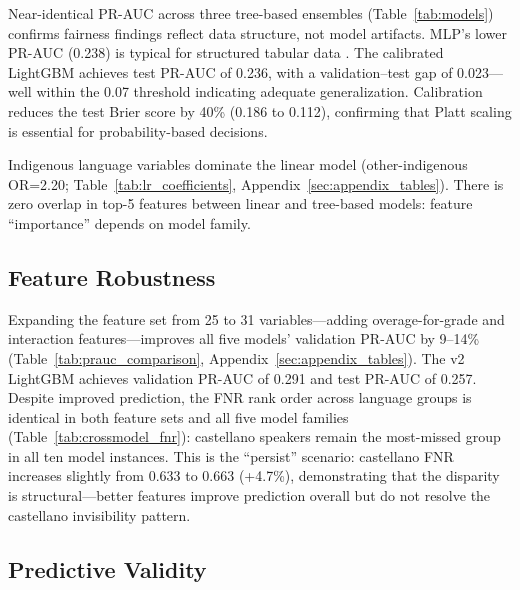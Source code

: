\documentclass[notitlepage,12pt]{jedm}
\begin{document}
\begin{table}[htbp]
  \caption{Model Performance Comparison Across Five Families (Survey-Weighted Metrics). The 31f column shows validation PR-AUC after adding 6 overage and interaction features.}\vspace*{1ex}
  \label{tab:models}
  
\end{table}

Near-identical PR-AUC across three tree-based ensembles (Table~\ref{tab:models}) confirms fairness findings reflect data structure, not model artifacts. MLP's lower PR-AUC (0.238) is typical for structured tabular data \cite{ke2017lightgbm}. The calibrated LightGBM achieves test PR-AUC of 0.236, with a validation--test gap of 0.023---well within the 0.07 threshold indicating adequate generalization. Calibration reduces the test Brier score by 40\% (0.186 to 0.112), confirming that Platt scaling is essential for probability-based decisions.

Indigenous language variables dominate the linear model (other-indigenous OR=2.20; Table~\ref{tab:lr_coefficients}, Appendix~\ref{sec:appendix_tables}). There is zero overlap in top-5 features between linear and tree-based models: feature ``importance'' depends on model family.

\subsection{Feature Robustness}

Expanding the feature set from 25 to 31 variables---adding overage-for-grade and interaction features---improves all five models' validation PR-AUC by 9--14\% (Table~\ref{tab:prauc_comparison}, Appendix~\ref{sec:appendix_tables}). The v2 LightGBM achieves validation PR-AUC of 0.291 and test PR-AUC of 0.257. Despite improved prediction, the FNR rank order across language groups is identical in both feature sets and all five model families (Table~\ref{tab:crossmodel_fnr}): castellano speakers remain the most-missed group in all ten model instances. This is the ``persist'' scenario: castellano FNR increases slightly from 0.633 to 0.663 (+4.7\%), demonstrating that the disparity is structural---better features improve prediction overall but do not resolve the castellano invisibility pattern.

\subsection{Predictive Validity}
\label{sec:predictive_validity}
\end{document}
